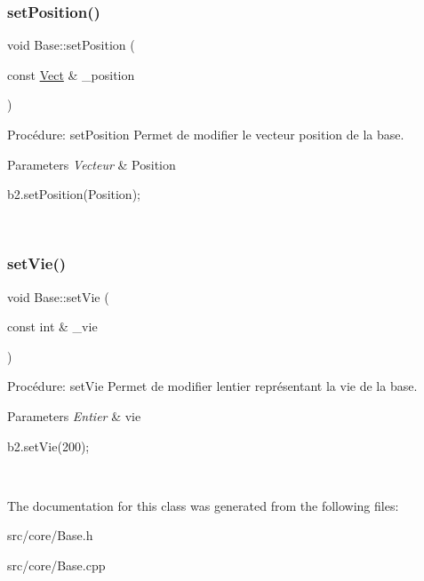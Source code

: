 \subsubsection{\texorpdfstring{set\+Position()}{setPosition()}}
{\footnotesize\ttfamily void Base\+::set\+Position (\begin{DoxyParamCaption}\item[{const \hyperlink{classVect}{Vect} \&}]{\+\_\+position }\end{DoxyParamCaption})}



Procédure\+: set\+Position Permet de modifier le vecteur position de la base. 


\begin{DoxyParams}{Parameters}
{\em Vecteur} & Position 
\begin{DoxyCode}
b2.setPosition(Position);
\end{DoxyCode}
 \\
\hline
\end{DoxyParams}
\mbox{\label{classBase_a92e0991ffd34efb2f2d6db3f3bd4093d}} 
\subsubsection{\texorpdfstring{set\+Vie()}{setVie()}}
{\footnotesize\ttfamily void Base\+::set\+Vie (\begin{DoxyParamCaption}\item[{const int \&}]{\+\_\+vie }\end{DoxyParamCaption})}



Procédure\+: set\+Vie Permet de modifier l\textquotesingle{}entier représentant la vie de la base. 


\begin{DoxyParams}{Parameters}
{\em Entier} & vie 
\begin{DoxyCode}
b2.setVie(200);
\end{DoxyCode}
 \\
\hline
\end{DoxyParams}


The documentation for this class was generated from the following files\+:\begin{DoxyCompactItemize}
\item 
src/core/Base.\+h\item 
src/core/Base.\+cpp\end{DoxyCompactItemize}
